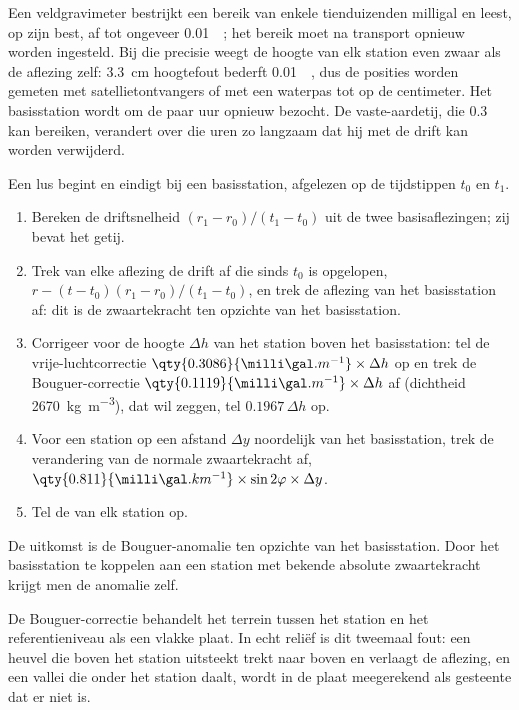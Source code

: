 Een veldgravimeter bestrijkt een bereik van enkele tienduizenden milligal en
leest, op zijn best, af tot ongeveer \qty{0.01}{\milli\gal}; het bereik moet na
transport opnieuw worden ingesteld. Bij die precisie weegt de hoogte van elk
station even zwaar als de aflezing zelf: \qty{3.3}{cm} hoogtefout
bederft \qty{0.01}{\milli\gal}, dus de posities worden gemeten met
satellietontvangers of met een waterpas tot op de centimeter. Het basisstation
wordt om de paar uur opnieuw bezocht. De vaste-aardetij, die
\qty{0.3}{\milli\gal} kan bereiken, verandert over die uren zo langzaam dat hij
met de drift kan worden verwijderd.

\begin{method}\label{met:b3:field-lab-methods-3:loop}
Een lus begint en eindigt bij een basisstation, afgelezen op de tijdstippen $t_0$ en $t_1$.
\begin{enumerate}
  \item Bereken de driftsnelheid $(r_1 - r_0)/(t_1 - t_0)$ uit de twee
        basisaflezingen; zij bevat het getij.
  \item Trek van elke aflezing de drift af die sinds $t_0$ is opgelopen,
        $r - (t - t_0)(r_1 - r_0)/(t_1 - t_0)$, en trek de aflezing van het
        basisstation af: dit is de zwaartekracht ten opzichte van het basisstation.
  \item Corrigeer voor de hoogte $\Delta h$ van het station boven het basisstation:
        tel de vrije-luchtcorrectie $\qty{0.3086}{\milli\gal.m^{-1}}
        \times\Delta h$ op en trek de Bouguer-correctie
        $\qty{0.1119}{\milli\gal.m^{-1}}\times\Delta h$ af (dichtheid
        \qty{2670}{kg.m^{-3}}), dat wil zeggen, tel $0.1967\,\Delta h$ op.
  \item Voor een station op een afstand $\Delta y$ noordelijk van het basisstation, trek
        de verandering van de normale zwaartekracht af, $\qty{0.811}{\milli\gal.km^{-1}}
        \times\sin 2\varphi\times\Delta y$.
  \item Tel de  van elk station op.
\end{enumerate}
De uitkomst is de Bouguer-anomalie ten opzichte van het basisstation. Door het
basisstation te koppelen aan een station met bekende absolute zwaartekracht krijgt men de anomalie zelf.
\end{method}

De Bouguer-correctie behandelt het terrein tussen het station en het
referentieniveau als een vlakke plaat. In echt reliëf is dit tweemaal fout:
een heuvel die boven het station uitsteekt trekt naar boven en verlaagt de
aflezing, en een vallei die onder het station daalt, wordt in de plaat meegerekend als
gesteente dat er niet is.

